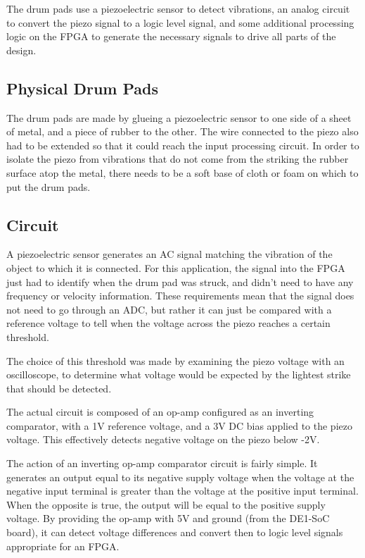 \documentclass{subfile}
\begin{document}
  The drum pads use a piezoelectric sensor to detect vibrations, an analog circuit to 
  convert the piezo signal to a logic level signal, and some additional processing 
  logic on the FPGA to generate the necessary signals to drive all parts of the 
  design. 

  \subsection{Physical Drum Pads} 
  The drum pads are made by glueing a piezoelectric sensor to one side of a sheet of 
  metal, and a piece of rubber to the other.
  The wire connected to the piezo also had to be extended so that it could reach the 
  input processing circuit.
  In order to isolate the piezo from vibrations that do not come from the striking the 
  rubber surface atop the metal, 
  there needs to be a soft base of cloth or foam on which to put the drum pads.

  \subsection{Circuit} 
  A piezoelectric sensor generates an AC signal matching the vibration of the object 
  to which it is connected.
  For this application, the signal into the FPGA just had to identify when 
  the drum pad was struck, and didn't need to have any frequency or velocity information. 
  These requirements mean that the signal does not need to go through an ADC, but rather 
  it can just be compared with a reference voltage to tell when the voltage across the 
  piezo reaches a certain threshold.

  The choice of this threshold was made by examining the piezo voltage with an 
  oscilloscope, to determine what voltage would be expected by the lightest strike that 
  should be detected.

  The actual circuit is composed of an op-amp configured as an inverting comparator, with a 
  1V reference voltage, and a 3V DC bias applied to the piezo voltage. 
  This effectively detects negative voltage on the piezo below -2V.

  The action of an inverting op-amp comparator circuit is fairly simple. 
  It generates an output equal to its negative supply voltage when the voltage at 
  the negative input terminal is greater than the voltage at the positive input terminal.
  When the opposite is true, the output will be equal to the positive supply voltage. 
  By providing the op-amp with 5V and ground (from the DE1-SoC board), it can detect 
  voltage differences and convert then to logic level signals appropriate for an FPGA.
\end{document}
